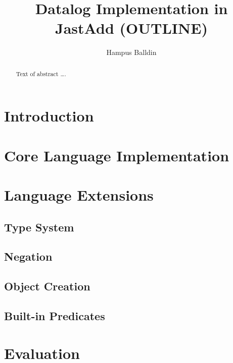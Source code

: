\documentclass[sigplan,10pt]{acmart}
\begin{document}
\title[Short Title]{Datalog Implementation in JastAdd (OUTLINE)}         %



\author{Hampus Balldin}


\begin{abstract}
Text of abstract \ldots.
\end{abstract}


\maketitle
\section{Introduction}

\section{Core Language Implementation}

\section{Language Extensions}
\subsection{Type System}
\subsection{Negation}
\subsection{Object Creation}
\subsection{Built-in Predicates}
\section{Evaluation}
\end{document}
